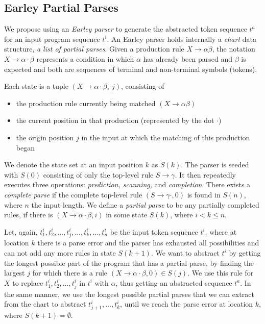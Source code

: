 \subsection{Earley Partial Parses}
\label{sec:prog-abstract:partial}

We propose using an \emph{Earley parser} to generate the abstracted token
sequence $t^a$ for an input program sequence $t^i$. An Earley parser holds
internally a \emph{chart} data structure, \ie \emph{a list of partial parses}.
Given a production rule $X \rightarrow \alpha \beta$, the notation $X
\rightarrow \alpha \cdot \beta$ represents a condition in which $\alpha$ has
already been parsed and $\beta$ is expected and both are sequences of terminal
and non-terminal symbols (tokens).

Each state is a tuple $(X \rightarrow \alpha \cdot \beta,\ j)$, consisting of
\begin{itemize}
    \item the production rule currently being matched $(X \rightarrow \alpha
    \beta)$
    \item the current position in that production (represented by the dot
    $\cdot$)
    \item the origin position $j$ in the input at which the matching of this
    production began
\end{itemize}

We denote the state set at an input position $k$ as $S(k)$. The parser is seeded
with $S(0)$ consisting of only the top-level rule $S \rightarrow \gamma$. It
then repeatedly executes three operations: \emph{prediction, scanning,} and
\emph{completion}. There exists a \emph{complete parse} if the complete
top-level rule $(S \rightarrow \gamma \cdot, 0)$ is found in $S(n)$, where $n$
the input length. We define a \emph{partial parse} to be any partially completed
rules, \ie if there is $(X \rightarrow \alpha \cdot \beta, i)$ in some state
$S(k)$, where $i < k \leq n$.

Let, again, $t^i_1, t^i_2, \dots, t^i_j, \dots, t^i_k, \dots, t^i_n$ be the
input token sequence $t^i$, where at location $k$ there is a parse error and the
parser has exhausted all possibilities and can not add any more rules in state
$S(k + 1)$. We want to abstract $t^i$ by getting the longest possible part of
the program that has a partial parse, \ie by finding the largest $j$ for which
there is a rule $(X \rightarrow \alpha \cdot \beta, 0) \in S(j)$. We use this
rule for $X$ to replace $t^i_1, t^i_2, \dots, t^i_j$ in $t^i$ with $\alpha$,
thus getting an abstracted sequence $t^a$. In the same manner, we use the
longest possible partial parses that we can extract from the chart to abstract
$t^i_{j+1}, \dots, t^i_k$, until we reach the parse error at location $k$, where
$S(k + 1) = \emptyset$.


